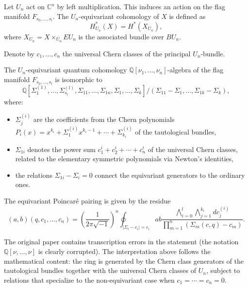 Let $U_n$ act on $\mathbb{C}^n$ by left multiplication. This induces an action on the flag manifold $F_{s_0, \ldots, s_l}$. The $U_n$-equivariant cohomology of $X$ is defined as
\[
H_{U_n}^*(X) = H^*(X_{U_n}),
\]
where $X_{U_n} = X \times_{U_n} EU_n$ is the associated bundle over $BU_n$.

Denote by $c_1, \ldots, c_n$ the universal Chern classes of the principal $U_n$-bundle.

\begin{Theorem}
\label{th:EquivariantQuantumCohomology}
The $U_n$-equivariant quantum cohomology $\mathbb{Q}[\nu_1, \ldots, \nu_n]$-algebra of the flag manifold $F_{s_0, \ldots, s_l}$ is isomorphic to
\[
\mathbb{Q}[\Sigma_1^{(1)}, \ldots, \Sigma_{s_l}^{(l)}, \Sigma_{11}, \ldots, \Sigma_{1n}, \Sigma_1, \ldots, \Sigma_k] / (\Sigma_{11} - \Sigma_1, \ldots, \Sigma_{1k} - \Sigma_k),
\]
where:
\begin{itemize}
\item $\Sigma_j^{(i)}$ are the coefficients from the Chern polynomials $P_i(x) = x^{k_i} + \Sigma_1^{(i)} x^{k_i-1} + \cdots + \Sigma_{k_i}^{(i)}$ of the tautological bundles,
\item $\Sigma_{1i}$ denotes the power sum $c_1^i + c_2^i + \cdots + c_n^i$ of the universal Chern classes, related to the elementary symmetric polynomials via Newton's identities,
\item the relations $\Sigma_{1i} - \Sigma_i = 0$ connect the equivariant generators to the ordinary ones.
\end{itemize}

The equivariant Poincar\'e pairing is given by the residue
\begin{equation}
(a, b)(q, c_1, \ldots, c_n) = \left(\frac{1}{2\pi\sqrt{-1}}\right)^n \oint_{| \Sigma_i - c_i | = \epsilon_i} ab \frac{\bigwedge_{i=0}^l \bigwedge_{j=1}^{k_i} d c_j^{(i)}}{\prod_{m=1}^n (\Sigma_m(c, q) - c_m)}.
\label{eq:equivariant-poincare-pairing}
\end{equation}
\end{Theorem}

\begin{Remark}
The original paper contains transcription errors in the statement (the notation $\mathbb{Q}[\nu, \ldots, \nu]$ is clearly corrupted). The interpretation above follows the mathematical content: the ring is generated by the Chern class generators of the tautological bundles together with the universal Chern classes of $U_n$, subject to relations that specialize to the non-equivariant case when $c_1 = \cdots = c_n = 0$.
\end{Remark}

